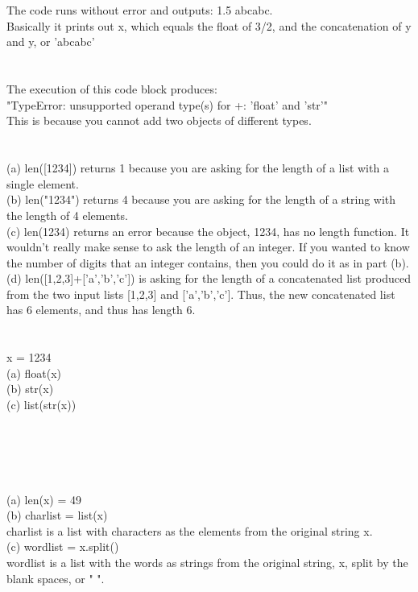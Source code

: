 \documentclass[12pt]{article}
\begin{document}
\section{}
The code runs without error and outputs: 1.5 abcabc.\\
Basically it prints out x, which equals the float of 3/2, and the concatenation of y and y, or 'abcabc'\\

\section{}
The execution of this code block produces:\\
"TypeError: unsupported operand type(s) for +: 'float' and 'str'"\\
This is because you cannot add two objects of different types.\\

\section{}
(a) len([1234]) returns 1 because you are asking for the length of a list with a single element.\\
(b) len("1234") returns 4 because you are asking for the length of a string with the length of 4 elements.\\
(c) len(1234) returns an error because the object, 1234, has no length function. It wouldn't really make sense to ask the length of an integer. If you wanted to know the number of digits that an integer contains, then you could do it as in part (b).\\
(d) len([1,2,3]+['a','b','c']) is asking for the length of a concatenated list produced from the two input lists [1,2,3] and ['a','b','c']. Thus, the new concatenated list has 6 elements, and thus has length 6. \\

\section{}
x = 1234 \\
(a) float(x)\\
(b) str(x)\\
(c) list(str(x))\\~\\~\\~\\

\section{}
(a) len(x) = 49 \\
(b) charlist = list(x) \\
charlist is a list with characters as the elements from the original string x.\\
(c) wordlist = x.split()\\
wordlist is a list with the words as strings from the original string, x, split by the blank spaces, or " ". 
\end{document}
